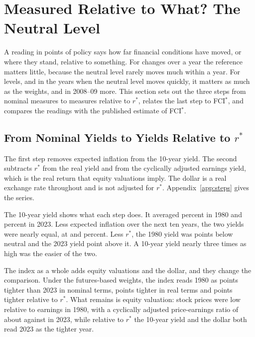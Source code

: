 \section{Measured Relative to What? The Neutral Level}\label{sec:neutral}
A reading in points of policy says how far financial conditions have moved, or where they stand, relative to something. For changes over a year the reference matters little, because the neutral level rarely moves much within a year. For levels, and in the years when the neutral level moves quickly, it matters as much as the weights, and in 2008--09 more. This section sets out the three steps from nominal measures to measures relative to $r^*$, relates the last step to FCI$^*$, and compares the readings with the published estimate of FCI$^*$.

\subsection{From Nominal Yields to Yields Relative to $r^*$}\label{sec:steps}
The first step removes expected inflation from the 10-year yield. The second subtracts $r^*$ from the real yield and from the cyclically adjusted earnings yield, which is the real return that equity valuations imply. The dollar is a real exchange rate throughout and is not adjusted for $r^*$. Appendix~\ref{app:steps} gives the series.

The 10-year yield shows what each step does. It averaged  percent in 1980 and  percent in 2023. Less expected inflation over the next ten years, the two yields were nearly equal, at  and  percent. Less $r^*$, the 1980 yield was  points below neutral and the 2023 yield  point above it. A 10-year yield nearly three times as high was the easier of the two.

The index as a whole adds equity valuations and the dollar, and they change the comparison. Under the futures-based weights, the index reads 1980 as  points tighter than 2023 in nominal terms,  points tighter in real terms and  points tighter relative to $r^*$. What remains is equity valuation: stock prices were low relative to earnings in 1980, with a cyclically adjusted price-earnings ratio of about  against  in 2023, while relative to $r^*$ the 10-year yield and the dollar both read 2023 as the tighter year.

